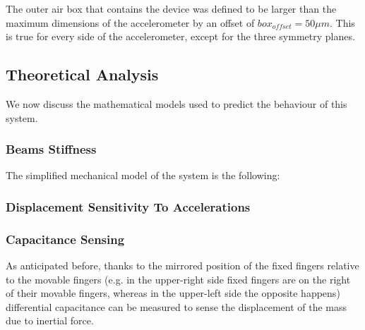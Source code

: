 \documentclass[lettersize,journal]{IEEEtran}
\begin{document}
        The outer air box that contains the device was defined to be larger than the maximum dimensions of the accelerometer by an offset of \(box_{offset}=50\mu m\). This is true for every side of the accelerometer, except for the three symmetry planes.
        
        \subsection{Theoretical Analysis}
        We now discuss the mathematical models used to predict the behaviour of this system.
        
        \subsubsection{Beams Stiffness}
        The simplified mechanical model of the system is the following:
        
        
        \subsubsection{Displacement Sensitivity To Accelerations}
        \subsubsection{Capacitance Sensing}\label{sssec:capacity}
        As anticipated before, thanks to the mirrored position of the fixed fingers relative to the movable fingers (e.g. in the upper-right side fixed fingers are on the right of their movable fingers, whereas in the upper-left side the opposite happens) differential capacitance can be measured to sense the displacement of the mass due to inertial force.
        
    
\end{document}
